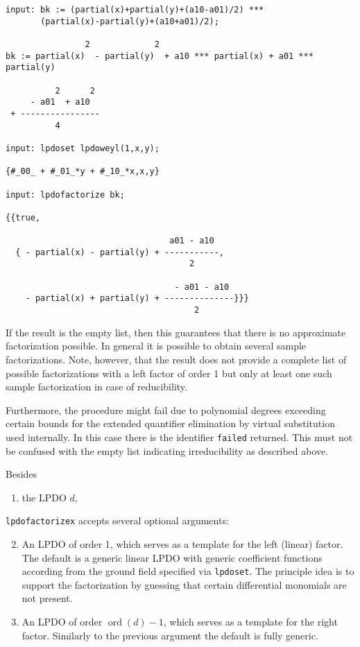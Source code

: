 \documentclass[a4paper]{article}
\begin{document}
\begin{footnotesize}
\begin{verbatim}
input: bk := (partial(x)+partial(y)+(a10-a01)/2) ***
       (partial(x)-partial(y)+(a10+a01)/2);

                2             2
bk := partial(x)  - partial(y)  + a10 *** partial(x) + a01 *** partial(y)

          2      2
     - a01  + a10
 + ----------------
          4

input: lpdoset lpdoweyl(1,x,y);

{#_00_ + #_01_*y + #_10_*x,x,y}

input: lpdofactorize bk;

{{true,

                                 a01 - a10
  { - partial(x) - partial(y) + -----------,
                                     2

                                  - a01 - a10
    - partial(x) + partial(y) + --------------}}}
                                      2
\end{verbatim}
\end{footnotesize}
If the result is the empty list, then this guarantees that there is no
approximate factorization possible. In general it is possible to obtain
several sample factorizations. Note, however, that the result does not
provide a complete list of possible factorizations with a left factor of
order 1 but only at least one such sample factorization in case of
reducibility.

Furthermore, the procedure might fail due to polynomial degrees
exceeding certain bounds for the extended quantifier elimination by
virtual substitution used internally. In this case there is the
identifier \texttt{failed} returned. This must not be confused with the
empty list indicating irreducibility as described above.

Besides
\begin{enumerate}
\item the LPDO $d$,
\end{enumerate}
\texttt{lpdofactorizex} accepts several optional arguments:
\begin{enumerate}
\setcounter{enumi}{1}
\item An LPDO of order 1, which serves as a template for the left
  (linear) factor. The default is a generic linear LPDO with generic
  coefficient functions according from the ground field specified via
  \texttt{lpdoset}. The principle idea is to support the factorization
  by guessing that certain differential monomials are not present.
\item An LPDO of order $\operatorname{ord}(d)-1$, which serves as a
  template for the right factor. Similarly to the previous argument the
  default is fully generic.
\end{enumerate}
\end{document}
